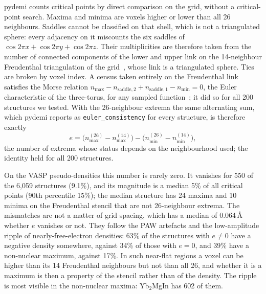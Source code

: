 \documentclass[11pt,a4paper]{article}
\begin{document}
pydemi counts critical points by direct comparison on the grid, without a
critical-point search. Maxima and minima are voxels higher or lower than all
26 neighbours. Saddles cannot be classified on that shell, which is not a
triangulated sphere: every adjacency on it miscounts the six saddles of
$\cos 2\pi x+\cos 2\pi y+\cos 2\pi z$. Their multiplicities are therefore taken
from the number of connected components of the lower and upper link on the
14-neighbour Freudenthal triangulation of the grid~\cite{freudenthal1942},
whose link is a triangulated sphere. Ties are broken by voxel index. A census
taken entirely on the Freudenthal link satisfies the Morse relation
$n_{\max}-n_{\mathrm{saddle},2}+n_{\mathrm{saddle},1}-n_{\min}=0$, the Euler
characteristic of the three-torus, for any sampled function~\cite{banchoff1970};
it did so for all 200 structures we tested. With the 26-neighbour extrema the
same alternating sum, which pydemi reports as \texttt{euler\_consistency} for
every structure, is therefore exactly
\begin{equation}
e = \big(n_{\max}^{(26)}-n_{\max}^{(14)}\big) - \big(n_{\min}^{(26)}-n_{\min}^{(14)}\big),
\end{equation}
the number of extrema whose status depends on the neighbourhood used; the
identity held for all 200 structures.

On the VASP pseudo-densities this number is rarely zero. It vanishes for 550
of the 6,059 structures (9.1\%), and its magnitude is a median 5\% of all
critical points (90th percentile 15\%); the median structure has 24 maxima and
10 minima on the Freudenthal stencil that are not 26-neighbour extrema. The
mismatches are not a matter of grid spacing, which has a median of
0.064\,\AA{} whether $e$ vanishes or not. They follow the PAW artefacts and the
low-amplitude ripple of nearly-free-electron densities: 63\% of the structures
with $e\neq0$ have a negative density somewhere, against 34\% of those with
$e=0$, and 39\% have a non-nuclear maximum, against 17\%. In such near-flat
regions a voxel can be higher than its 14 Freudenthal neighbours but not than
all 26, and whether it is a maximum is then a property of the stencil rather
than of the density. The ripple is most visible in the non-nuclear maxima:
Yb$_2$MgIn has 602 of them.
\end{document}
